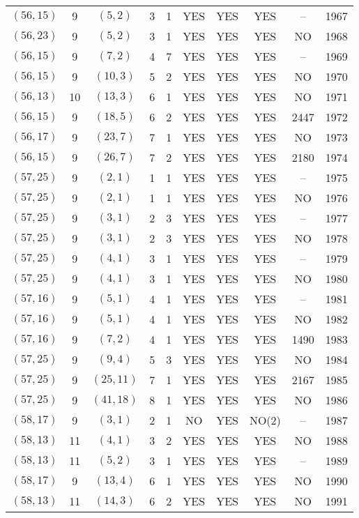 \begin{longtable}{|c|c|c|c|c|c|c|c|c|c|}
$(56, 15)$ & 9 & $(5, 2)$ & 3 & 1 & YES & YES & YES & -- & 1967\\
$(56, 23)$ & 9 & $(5, 2)$ & 3 & 1 & YES & YES & YES & NO & 1968\\
$(56, 15)$ & 9 & $(7, 2)$ & 4 & 7 & YES & YES & YES & -- & 1969\\
$(56, 15)$ & 9 & $(10, 3)$ & 5 & 2 & YES & YES & YES & NO & 1970\\
$(56, 13)$ & 10 & $(13, 3)$ & 6 & 1 & YES & YES & YES & NO & 1971\\
$(56, 15)$ & 9 & $(18, 5)$ & 6 & 2 & YES & YES & YES & 2447 & 1972\\
$(56, 17)$ & 9 & $(23, 7)$ & 7 & 1 & YES & YES & YES & NO & 1973\\
$(56, 15)$ & 9 & $(26, 7)$ & 7 & 2 & YES & YES & YES & 2180 & 1974\\
$(57, 25)$ & 9 & $(2, 1)$ & 1 & 1 & YES & YES & YES & -- & 1975\\
$(57, 25)$ & 9 & $(2, 1)$ & 1 & 1 & YES & YES & YES & NO & 1976\\
$(57, 25)$ & 9 & $(3, 1)$ & 2 & 3 & YES & YES & YES & -- & 1977\\
$(57, 25)$ & 9 & $(3, 1)$ & 2 & 3 & YES & YES & YES & NO & 1978\\
$(57, 25)$ & 9 & $(4, 1)$ & 3 & 1 & YES & YES & YES & -- & 1979\\
$(57, 25)$ & 9 & $(4, 1)$ & 3 & 1 & YES & YES & YES & NO & 1980\\
$(57, 16)$ & 9 & $(5, 1)$ & 4 & 1 & YES & YES & YES & -- & 1981\\
$(57, 16)$ & 9 & $(5, 1)$ & 4 & 1 & YES & YES & YES & NO & 1982\\
$(57, 16)$ & 9 & $(7, 2)$ & 4 & 1 & YES & YES & YES & 1490 & 1983\\
$(57, 25)$ & 9 & $(9, 4)$ & 5 & 3 & YES & YES & YES & NO & 1984\\
$(57, 25)$ & 9 & $(25, 11)$ & 7 & 1 & YES & YES & YES & 2167 & 1985\\
$(57, 25)$ & 9 & $(41, 18)$ & 8 & 1 & YES & YES & YES & NO & 1986\\
$(58, 17)$ & 9 & $(3, 1)$ & 2 & 1 & NO & YES & NO(2) & -- & 1987\\
$(58, 13)$ & 11 & $(4, 1)$ & 3 & 2 & YES & YES & YES & NO & 1988\\
$(58, 13)$ & 11 & $(5, 2)$ & 3 & 1 & YES & YES & YES & -- & 1989\\
$(58, 17)$ & 9 & $(13, 4)$ & 6 & 1 & YES & YES & YES & NO & 1990\\
$(58, 13)$ & 11 & $(14, 3)$ & 6 & 2 & YES & YES & YES & NO & 1991\\

\end{longtable}
